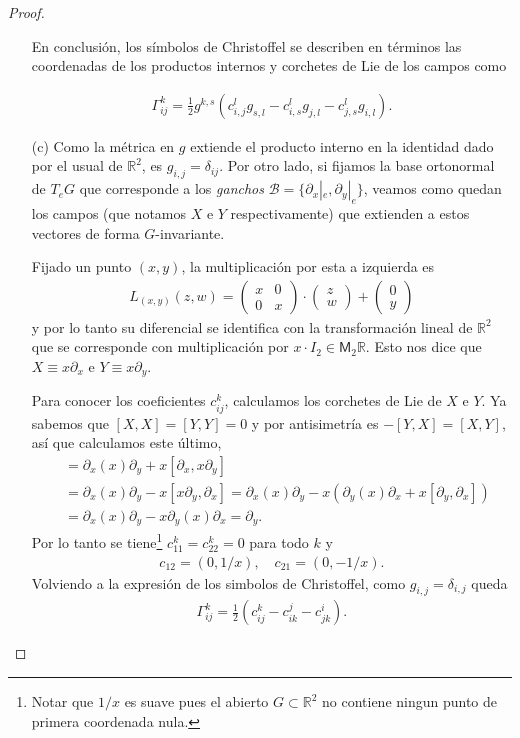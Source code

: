 \documentclass[11pt]{article}
\newcommand{\R}{\mathbb{R}}
\newcommand{\M}[2]{\mathsf{M}_{#1}#2}
\begin{document}
\begin{proof}
\begin{itemize}[listparindent = \parindent]
En conclusión, los símbolos de Christoffel se describen en términos las coordenadas de los productos internos y corchetes de Lie de los campos como

\begin{align*}
\Gamma_{ij}^k = \frac{1}{2}g^{k,s}\left(c^l_{i,j}g_{s,l} - c^l_{i,s}g_{j,l} - c^l_{j,s}g_{i,l}\right).
\end{align*}

\item[(c)] Como la métrica en $g$ extiende el producto interno en la identidad dado por el usual de $\R^2$, es $g_{i,j} = \delta_{ij}$. Por otro lado, si fijamos la base ortonormal de $T_eG$ que corresponde a los \textit{ganchos} $\mathscr{B} = \{\partial_x|_e,\partial_y|_e\}$, veamos como quedan los campos (que notamos $X$ e $Y$ respectivamente) que extienden a estos vectores de forma $G$-invariante. 

Fijado un punto $(x,y)$, la multiplicación por esta a izquierda es
\begin{align*}
L_{(x,y)}(z,w) = \begin{pmatrix}
x & 0\\
0 & x
\end{pmatrix}\cdot \begin{pmatrix}
z\\
w
\end{pmatrix}  + \begin{pmatrix}
0\\y
\end{pmatrix}
\end{align*}
y por lo tanto su diferencial se identifica con la transformación lineal de $\R^2$ que se corresponde con multiplicación por $x \cdot I_2 \in \M{2}{\R}$. Esto nos dice que $X \equiv x \partial_x$ e $Y \equiv x\partial_y$. 

Para conocer los coeficientes $c_{ij}^k$, calculamos los corchetes de Lie de $X$ e $Y$. Ya sabemos que $[X,X] = [Y,Y] = 0$ y por antisimetría es $-[Y,X] = [X,Y]$, así que calculamos este último,
\begin{align*}
[x\partial_x,x\partial_y] &= \partial_x(x)\partial_y + x[\partial_x,x\partial_y]\\
&= \partial_x(x)\partial_y - x[x\partial_y,\partial_x] = \partial_x(x)\partial_y -x\left(\partial_y(x)\partial_x + x[\partial_y,\partial_x]\right)\\
&= \partial_x(x)\partial_y -x\partial_y(x)\partial_x = \partial_y.
\end{align*}
Por lo tanto se tiene\footnote{Notar que $1/x$ es suave pues el abierto $G \subset \R^2$ no contiene ningun punto de primera coordenada nula.} $c_{11}^k = c_{22}^k = 0$ para todo $k$ y
\begin{align*}
c_{12} = (0,1/x), \quad c_{21} = (0,-1/x).
\end{align*} 
Volviendo a la expresión de los simbolos de Christoffel, como $g_{i,j} = \delta_{i,j}$ queda
\begin{align*}
\Gamma_{ij}^k = \frac{1}{2}(c^k_{ij}-c^j_{ik}-c^i_{jk}).
\end{align*}


\end{itemize}
\end{proof}
\end{document}
